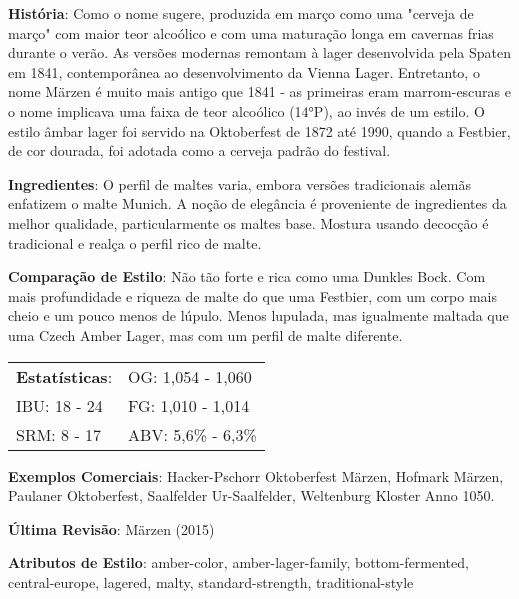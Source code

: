\textbf{História}: Como o nome sugere, produzida em março como uma "cerveja de março" com maior teor alcoólico e com uma maturação longa em cavernas frias durante o verão. As versões modernas remontam à lager desenvolvida pela Spaten em 1841, contemporânea ao desenvolvimento da Vienna Lager. Entretanto, o nome Märzen é muito mais antigo que 1841 - as primeiras eram marrom-escuras e o nome implicava uma faixa de teor alcoólico (14°P), ao invés de um estilo. O estilo âmbar lager foi servido na Oktoberfest de 1872 até 1990, quando a Festbier, de cor dourada, foi adotada como a cerveja padrão do festival.

\textbf{Ingredientes}: O perfil de maltes varia, embora versões tradicionais alemãs enfatizem o malte Munich. A noção de elegância é proveniente de ingredientes da melhor qualidade, particularmente os maltes base. Mostura usando decocção é tradicional e realça o perfil rico de malte.

\textbf{Comparação de Estilo}: Não tão forte e rica como uma Dunkles Bock. Com mais profundidade e riqueza de malte do que uma Festbier, com um corpo mais cheio e um pouco menos de lúpulo. Menos lupulada, mas igualmente maltada que uma Czech Amber Lager, mas com um perfil de malte diferente.

\begin{tabular}{@{}p{35mm}p{35mm}@{}}
  \textbf{Estatísticas}: & OG: 1,054 - 1,060 \\
  IBU: 18 - 24  & FG: 1,010 - 1,014  \\
  SRM: 8 - 17  & ABV: 5,6\% - 6,3\%
\end{tabular}

\textbf{Exemplos Comerciais}: Hacker-Pschorr Oktoberfest Märzen, Hofmark Märzen, Paulaner Oktoberfest, Saalfelder Ur-Saalfelder, Weltenburg Kloster Anno 1050.

\textbf{Última Revisão}: Märzen (2015)

\textbf{Atributos de Estilo}: amber-color, amber-lager-family, bottom-fermented, central-europe, lagered, malty, standard-strength, traditional-style
